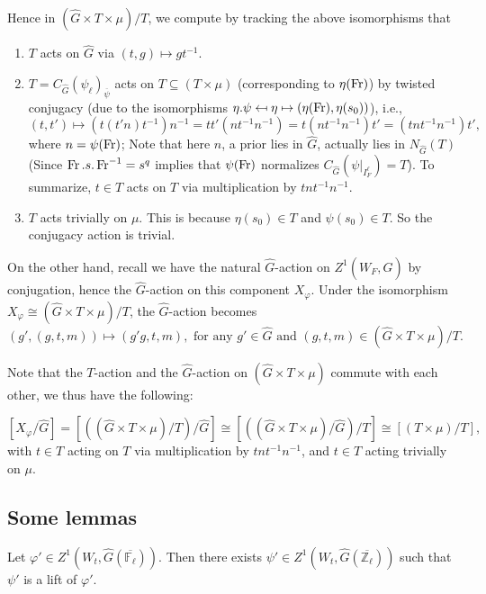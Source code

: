 Hence in $(\hat{G} \times T \times \mu)/T$, we compute by tracking the above isomorphisms that 
\begin{enumerate}
	\item $T$ acts on $\hat{G}$ via $(t, g) \mapsto gt^{-1}$.
	\item $T=C_{\hat{G}}(\psi_{\ell})_{\overline{\psi}}$ acts on $T \subseteq (T \times \mu)$ (corresponding to $\eta(\operatorname{Fr})$) by twisted conjugacy (due to the isomorphisms $\eta.\psi \mapsfrom \eta \mapsto (\eta(\operatorname{Fr}), \eta(s_0))$), i.e., 
	$$(t, t') \mapsto \left(t(t'n)t^{-1}\right)n^{-1}=tt'(nt^{-1}n^{-1})=t(nt^{-1}n^{-1})t'=(tnt^{-1}n^{-1})t',$$
	where $n=\psi(\operatorname{Fr})$; Note that here $n$, a prior lies in $\hat{G}$, actually lies in $N_{\hat{G}}(T)$ (Since $\operatorname{Fr}.s.\operatorname{Fr}^{-1}=s^q$ implies that $\psi(\operatorname{Fr})$ normalizes $C_{\hat{G}}(\psi|_{I_F^{\ell}})=T$). To summarize, $t \in T$ acts on $T$ via multiplication by $tnt^{-1}n^{-1}$.
	\item $T$ acts trivially on $\mu$. This is because $\eta(s_0) \in T$ and $\psi(s_0) \in T$. So the conjugacy action is trivial.
\end{enumerate}

On the other hand, recall we have the natural $\hat{G}$-action on $Z^1(W_F, \hat{G})$ by conjugation, hence the $\hat{G}$-action on this component $X_{\varphi}$. Under the isomorphism $X_{\varphi} \cong (\hat{G} \times T \times \mu)/T$, the $\hat{G}$-action becomes
$$(g', (g, t, m)) \mapsto  (g'g, t, m), \text{ for any } g' \in \hat{G} \text{ and } (g, t, m) \in (\hat{G} \times T \times \mu)/T.$$

Note that the $T$-action and the $\hat{G}$-action on $(\hat{G} \times T \times \mu)$ commute with each other, we thus have the following:

\begin{proposition}\label{T times mu/T}
	$$[X_{\varphi}/\hat{G}]=\left[\left((\hat{G} \times T \times \mu)/T\right)/\hat{G}\right] \cong \left[\left((\hat{G} \times T \times \mu)/\hat{G}\right)/T\right] \cong [(T \times \mu)/T],$$ 
	with $t \in T$ acting on $T$ via multiplication by $tnt^{-1}n^{-1}$, and $t \in T$ acting trivially on $\mu$. 
\end{proposition}

\subsection{Some lemmas}

\begin{lemma}\label{Lem generalizing}
	Let $\varphi' \in Z^1(W_t, \hat{G}(\overline{\mathbb{F}_{\ell}}))$. Then there exists $\psi' \in Z^1(W_t, \hat{G}(\overline{\mathbb{Z}_{\ell}}))$ such that $\psi'$ is a lift of $\varphi'$.
\end{lemma}


